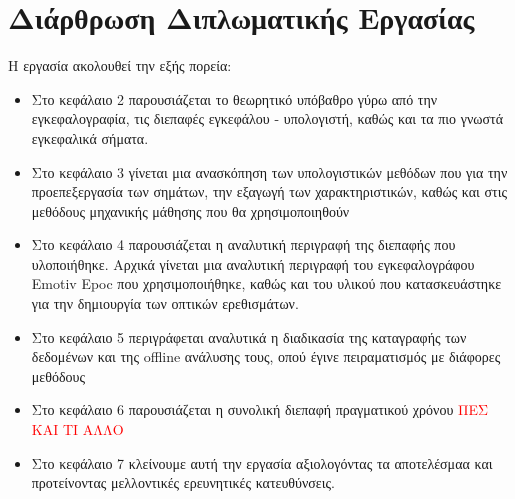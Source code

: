 \documentclass[11pt,a4paper,english,greek,twoside]{../Thesis}
\begin{document}
\section{Διάρθρωση Διπλωματικής Εργασίας}
\par Η εργασία ακολουθεί την εξής πορεία:
\begin{itemize}
	\item Στο κεφάλαιο 2 παρουσιάζεται το θεωρητικό υπόβαθρο γύρω από την εγκεφαλογραφία, τις διεπαφές εγκεφάλου - υπολογιστή, καθώς και τα πιο γνωστά εγκεφαλικά σήματα.
	\item Στο κεφάλαιο 3 γίνεται μια ανασκόπηση των υπολογιστικών μεθόδων που για την προεπεξεργασία των σημάτων, την εξαγωγή των χαρακτηριστικών, καθώς και στις μεθόδους μηχανικής μάθησης που θα χρησιμοποιηθούν
	\item Στο κεφάλαιο 4 παρουσιάζεται η αναλυτική περιγραφή της διεπαφής που υλοποιήθηκε. Αρχικά γίνεται μια αναλυτική περιγραφή του εγκεφαλογράφου Emotiv Epoc που χρησιμοποιήθηκε, καθώς και του υλικού που κατασκευάστηκε για την δημιουργία των οπτικών ερεθισμάτων.
	\item Στο κεφάλαιο 5 περιγράφεται αναλυτικά η διαδικασία της καταγραφής των δεδομένων και της offline ανάλυσης τους, οπού έγινε πειραματισμός με διάφορες μεθόδους
	\item Στο κεφάλαιο 6 παρουσιάζεται η συνολική διεπαφή πραγματικού χρόνου \textcolor{red}{ΠΕΣ ΚΑΙ ΤΙ ΑΛΛΟ}
	\item Στο κεφάλαιο 7 κλείνουμε αυτή την εργασία αξιολογόντας τα αποτελέσμαα και προτείνοντας μελλοντικές ερευνητικές κατευθύνσεις. 
\end{itemize}
\end{document}
